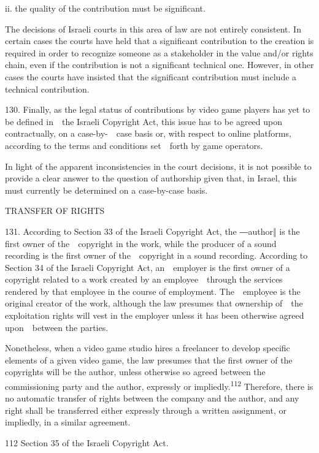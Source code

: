 \documentclass[
]{article}
\begin{document}
{ii. }{the quality of the contribution must be significant.}

{The decisions of Israeli courts in this area of law are not entirely
consistent. In certain cases the courts have held that a significant
contribution to the creation is required in order to recognize someone
as a stakeholder in the value and/or rights chain, even if the
contribution is not a significant technical one. However, in other cases
the courts have insisted that the significant contribution must include
a technical contribution.}

{130. }{Finally, as the legal status of contributions by video game
players has yet to be defined in~~the Israeli }{Copyright Act}{, this
issue has to be agreed upon contractually, on a case-by-~~case basis or,
with respect to online platforms, according to the terms and conditions
set~~forth by game operators.}

{In light of the apparent inconsistencies in the court decisions, it is
not possible to provide a clear answer to the question of authorship
given that, in Israel, this must currently be determined on a
case-by-case basis.}

{TRANSFER OF RIGHTS}

{131. }{According to Section 33 of the Israeli }{Copyright Act, }{the
―}{author‖ }{is the first owner of the~~copyright in the work, while the
producer of a sound recording is the first owner of the~~copyright in a
sound recording. According to Section 34 of the Israeli }{Copyright
Act}{, an~~employer is the first owner of a copyright related to a work
created by an employee~~through the services rendered by that employee
in the course of employment. The~~employee is the original creator of
the work, although the law presumes that ownership of~~the exploitation
rights will vest in the employer unless it has been otherwise agreed
upon~~between the parties.}

{Nonetheless, when a video game studio hires a freelancer to develop
specific elements of a given video game, the law presumes that the first
owner of the copyrights will be the author, unless otherwise so agreed
between the commissioning party and the author, expressly or
impliedly.}\textsuperscript{{112 }}{Therefore, there is no automatic
transfer of rights between the company and the author, and any right
shall be transferred either expressly through a written assignment, or
impliedly, in a similar agreement.}

{112 }{Section 35 of the Israeli }{Copyright Act}{.}
\end{document}
